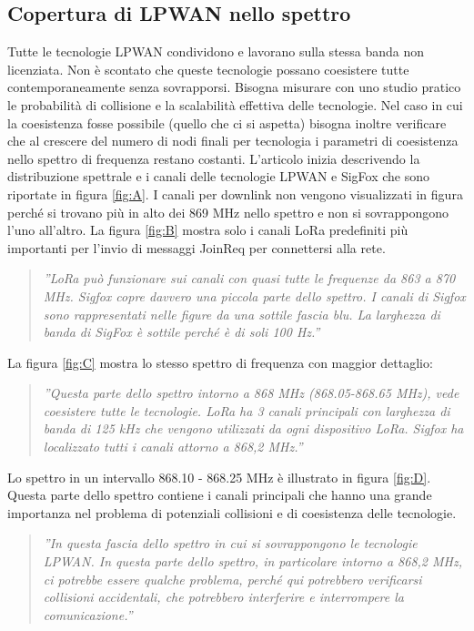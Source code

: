 \documentclass[a4paper]{report} %
\begin{document}
\subsection{Copertura di LPWAN nello spettro}
Tutte le tecnologie LPWAN condividono e lavorano sulla stessa banda non licenziata. Non è scontato che queste tecnologie possano coesistere tutte contemporaneamente senza sovrapporsi. Bisogna misurare con uno studio pratico le probabilità di collisione e la scalabilità effettiva delle tecnologie. Nel caso in cui la coesistenza fosse possibile (quello che ci si aspetta) bisogna inoltre verificare che al crescere del numero di nodi finali per tecnologia i parametri di coesistenza nello spettro di frequenza restano costanti.
L'articolo \cite{art:rif.46} inizia descrivendo la distribuzione spettrale e i canali delle tecnologie LPWAN e SigFox che sono riportate in figura \ref{fig:A}. I canali per downlink non vengono visualizzati in figura perché si trovano più in alto dei 869 MHz nello spettro e non si sovrappongono l'uno all'altro. La figura \ref{fig:B} mostra solo i canali LoRa predefiniti più importanti per l'invio di messaggi JoinReq per connettersi alla rete.  
\begin{quote}
	\textit{''LoRa può funzionare sui canali con quasi tutte le frequenze da 863 a 870 MHz. Sigfox copre davvero una piccola parte dello spettro. I canali di Sigfox sono rappresentati nelle figure da una sottile fascia blu. La larghezza di banda di SigFox è sottile perché è di soli 100 Hz.''}
\end{quote}
La figura \ref{fig:C} mostra lo stesso spettro di frequenza con maggior dettaglio:
\begin{quote}
	\textit{''Questa parte dello spettro intorno a 868 MHz (868.05-868.65 MHz), vede coesistere tutte le tecnologie. LoRa ha 3 canali principali con larghezza di banda di 125 kHz che vengono utilizzati da ogni dispositivo LoRa. Sigfox ha localizzato tutti i canali attorno a 868,2 MHz.''}
\end{quote}
Lo spettro in un intervallo 868.10 - 868.25 MHz è illustrato in figura \ref{fig:D}. Questa parte dello spettro contiene i canali principali che hanno una grande importanza nel problema di potenziali collisioni e di coesistenza delle tecnologie. 
\begin{quote}
	\textit{''In questa fascia dello spettro in cui si sovrappongono le tecnologie LPWAN. In questa parte dello spettro, in particolare intorno a 868,2 MHz, ci potrebbe essere qualche problema, perché qui potrebbero verificarsi collisioni accidentali, che potrebbero interferire e interrompere la comunicazione.''}
\end{quote}
\end{document}
